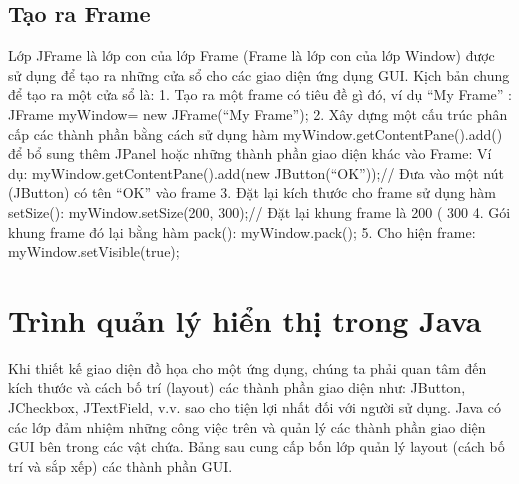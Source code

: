  \subsection{ Tạo ra Frame}
Lớp JFrame là lớp con của lớp Frame (Frame là lớp con của lớp Window)
được sử dụng để tạo ra những cửa sổ cho các giao diện ứng dụng GUI.
Kịch bản chung để tạo ra một cửa sổ là:
1. Tạo ra một frame có tiêu đề gì đó, ví dụ “My Frame” :
JFrame myWindow= new JFrame(“My Frame”);
2. Xây dựng một cấu trúc phân cấp các thành phần bằng cách sử dụng hàm
myWindow.getContentPane().add() để bổ sung thêm JPanel hoặc những
thành phần giao diện khác vào Frame:
Ví dụ: myWindow.getContentPane().add(new JButton(“OK”));// Đưa vào
một nút (JButton) có tên “OK” vào frame
3. Đặt lại kích thước cho frame sử dụng hàm setSize():
myWindow.setSize(200, 300);// Đặt lại khung frame là 200 ( 300
4. Gói khung frame đó lại bằng hàm pack():
myWindow.pack();
5. Cho hiện frame:
myWindow.setVisible(true);
\section{Trình quản lý hiển thị trong Java}
Khi thiết kế giao diện đồ họa cho một ứng dụng, chúng ta phải quan tâm
đến kích thước và cách bố trí (layout) các thành phần giao diện như: JButton,
JCheckbox, JTextField, v.v. sao cho tiện lợi nhất đối với người sử dụng. Java có
các lớp đảm nhiệm những công việc trên và quản lý các thành phần giao diện GUI
bên trong các vật chứa.
Bảng sau cung cấp bốn lớp quản lý layout (cách bố trí và sắp xếp) các thành phần
GUI.


